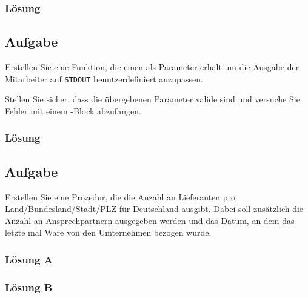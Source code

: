 \subsubsection*{Lösung}
\label{sec:uebung_07.aufgabe_02.loesung}

\subsection{Aufgabe}
\label{sec:uebung_07.aufgabe_03}
Erstellen Sie eine Funktion, die einen  als Parameter erhält um die Ausgabe der Mitarbeiter auf \texttt{STDOUT} benutzerdefiniert anzupassen.

\begin{example-popup}
\end{example-popup}

Stellen Sie sicher, dass die übergebenen Parameter valide sind und versuche Sie Fehler mit einem -Block abzufangen.

\subsubsection*{Lösung}
\label{sec:uebung_07.aufgabe_03.loesung}

\subsection{Aufgabe}
\label{sec:uebung_07.aufgabe_04}
Erstellen Sie eine Prozedur, die die Anzahl an Lieferanten pro Land/Bundesland/Stadt/PLZ für Deutschland ausgibt. Dabei soll zusätzlich die Anzahl an Ansprechpartnern ausgegeben werden und das Datum, an dem das letzte mal Ware von den Umternehmen bezogen wurde.

\subsubsection*{Lösung A}
\label{sec:uebung_07.aufgabe_04.loesung.A}

\subsubsection*{Lösung B}
\label{sec:uebung_07.aufgabe_04.loesung.B}

